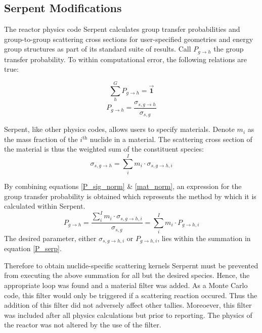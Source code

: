 \documentclass{physor2012}
\newcommand{\superscript}[1]{\ensuremath{^{\textrm{#1}}}}
\begin{document}
\subsection{Serpent Modifications}

The reactor physics code Serpent calculates group transfer probabilities and 
group-to-group scattering cross sections for user-specified geometries and energy 
group structures as part of its standard suite of results.   Call $P_{g\to h}$  
the group transfer probability.  To within computational error, the following 
relations are true:

\begin{equation}\label{P_h_norm}\sum_h^G P_{g\to h} = \mathbf{\vec{1}}\end{equation}
\begin{equation}\label{P_sig_norm}P_{g\to h} = \frac{\sigma_{s,g\to h}}{\sigma_{s,g}}\end{equation}

Serpent, like other physics codes, allows users to specify materials.
Denote $m_i$ as the mass fraction of the $i$\superscript{th} nuclide 
in a material.  The scattering cross section of the material is thus
the weighted sum of the constituent species:
\begin{equation}\label{mat_norm}\sigma_{s,g\to h} = \sum_i^I m_i \cdot \sigma_{s,g\to h,i}\end{equation}

By combining equations \ref{P_sig_norm} \& \ref{mat_norm}, an expression for the
group transfer probability is obtained which represents the method by which it
is calculated within Serpent.
\begin{equation}
\label{P_serp}
P_{g\to h} = \frac{\sum_i^I m_i \cdot \sigma_{s,g\to h,i}}{\sigma_{s,g}} = \sum_i^I m_i \cdot P_{g\to h,i}
\end{equation}
The desired parameter, either $\sigma_{s,g\to h,i}$ or $P_{g\to h,i}$, lies within
the summation in equation \ref{P_serp}.

Therefore to obtain nuclide-specific scattering kernels Serpernt must be prevented
from executing the above summation for all but the desired species.  Hence, the 
appropriate loop was found and a material filter was added.  As a Monte Carlo code, 
this filter would only be triggered if a scattering reaction occured.  Thus the
addition of this filter did not adversely affect other tallies.  Moreoever, this
filter was included after all physics calculations but prior to reporting.  The 
physics of the reactor was not altered by the use of the filter.
\end{document}
